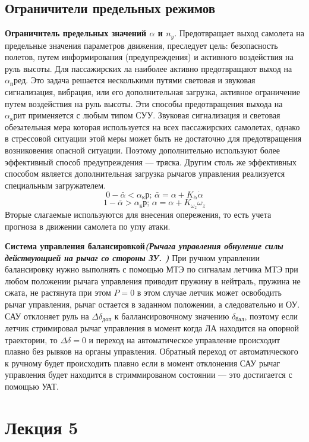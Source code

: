 \documentclass{article}
\begin{document}
\subsection{Ограничители предельных режимов}
\textbf{Ограничитель предельных значений $\alpha$ и $n_y$}.
Предотвращает выход самолета на предельные значения параметров движения, преследует цель: безопасность полетов, путем информирования (предупреждения) и активного воздействия на руль высоты. Для пассажирских ла наиболее активно предотвращают выход на $\alpha_пред$. Это задача решается несколькими путями световая и звуковая сигнализация, вибрация, или его дополнительная загрузка, активное ограничение путем воздействия на руль высоты. Эти способы предотвращения выхода на $\alpha_крит$ применяется с любым типом СУУ. Звуковая сигнализация и световая обезательная мера которая используется на всех пассажирских самолетах, однако в стрессовой ситуации этой меры может быть не достаточно для предотвращения возниковения опасной ситуации. Поэтому дополнительно используют более эффективный способ предупреждения --- тряска. Другим столь же эффективных способом является дополнительная загрузка рычагов управления реализуется специальным загружателем.
\[
0 - \bar{\alpha} < \alpha_кр; \, \bar{\alpha} = \alpha + K_{\dot{\alpha}} \dot{\alpha} 
\]
\[
1 - \bar{\alpha} > \alpha_кр; \, \alpha = \alpha + K_{\omega_z} \omega_z 
\]
Вторые слагаемые используются для внесения опережения, то есть учета прогноза в движении самолета по углу атаки.

\textbf{Система управления балансировкой\emph{(Рычага управления обнуление силы действующией на рычаг со стороны ЗУ. )}}
При ручном управлении балансировку нужно выполнять с помощью МТЭ по сигналам летчика МТЭ при любом положении рычага управления приводит пружину в нейтраль, пружина не сжата, не растянута при этом $P=0$ в этом случае летчик может освободить рычаг управления, рычаг остается в заданном положении, а следовательно и ОУ.
САУ отклоняет руль на $\Delta\delta_{доп}$ к баллансировочному значению $\delta_{бал}$, поэтому если летчик стримировал рычаг управления в момент когда ЛА находится на опорной траектории, то $\Delta\delta = 0$ и переход на автоматическое управление происходит плавно без рывков на органы управления.
Обратный переход от автоматического к ручному будет происходить плавно если в момент отклонения САУ рычаг управления будет находится в стриммированом состоянии --- это достигается с помощью УАТ.

\newpage
\section{Лекция 5}
\end{document}
